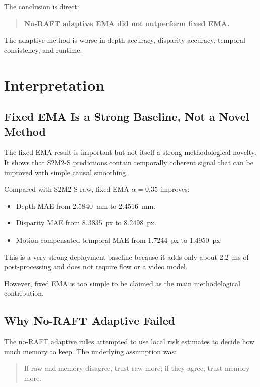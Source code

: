 \documentclass[11pt,a4paper]{article}
\begin{document}
The conclusion is direct:

\begin{quote}
\textbf{No-RAFT adaptive EMA did not outperform fixed EMA.}
\end{quote}

The adaptive method is worse in depth accuracy, disparity accuracy, temporal consistency, and runtime.

\section{Interpretation}

\subsection{Fixed EMA Is a Strong Baseline, Not a Novel Method}

The fixed EMA result is important but not itself a strong methodological novelty. It shows that S2M2-S predictions contain temporally coherent signal that can be improved with simple causal smoothing.

Compared with S2M2-S raw, fixed EMA $\alpha=0.35$ improves:

\begin{itemize}[leftmargin=*]
    \item Depth MAE from \SI{2.5840}{mm} to \SI{2.4516}{mm}.
    \item Disparity MAE from \SI{8.3835}{px} to \SI{8.2498}{px}.
    \item Motion-compensated temporal MAE from \SI{1.7244}{px} to \SI{1.4950}{px}.
\end{itemize}

This is a very strong deployment baseline because it adds only about \SI{2.2}{ms} of post-processing and does not require flow or a video model.

However, fixed EMA is too simple to be claimed as the main methodological contribution.

\subsection{Why No-RAFT Adaptive Failed}

The no-RAFT adaptive rules attempted to use local risk estimates to decide how much memory to keep. The underlying assumption was:

\begin{quote}
If raw and memory disagree, trust raw more; if they agree, trust memory more.
\end{quote}
\end{document}
